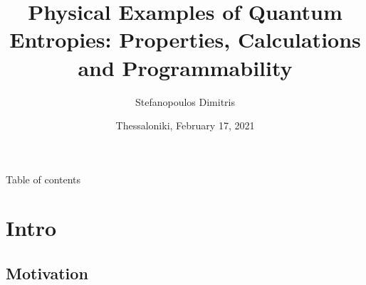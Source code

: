 \documentclass{beamer}
\begin{document}

\author[]{Stefanopoulos Dimitris}
\title{Physical Examples of Quantum Entropies: Properties, Calculations and Programmability}
\date{Thessaloniki, February 17, 2021}
\frame{\titlepage}


\begin{frame}{Table of contents}
\tableofcontents
\end{frame}


\section{Intro}

\subsection{Motivation}
\end{document}
